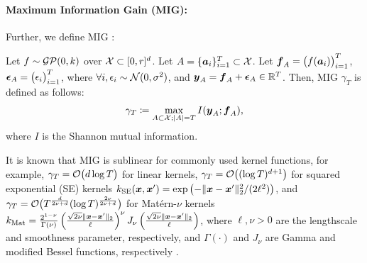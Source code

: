 \paragraph{Maximum Information Gain (MIG):}
%
Further, we define MIG \citep{Srinivas2010-Gaussian,vakili2021-information}:
\begin{definition}
    Let $f \sim {\cal G} {\cal P} (0, k)$ over ${\cal X} \subset [0, r]^d$.
    Let $A = \{ \boldsymbol{a}_i \}_{i=1}^T \subset {\cal X}$.
    Let $\boldsymbol{f}_A = \bigl(f(\boldsymbol{a}_i) \bigr)_{i=1}^T$, $\boldsymbol{\epsilon}_A = \bigl(\epsilon_i \bigr)_{i=1}^T$, where $\forall i, \epsilon_i \sim {\cal N}(0, \sigma^2)$, and $\boldsymbol{y}_A = \boldsymbol{f}_A + \boldsymbol{\epsilon}_A \in \mathbb{R}^T$.
    Then, MIG $\gamma_T$ is defined as follows:
    \begin{align*}
        \gamma_T \coloneqq \max_{A \subset {\cal X}; |A| = T} I(\boldsymbol{y}_A ; \boldsymbol{f}_A),
    \end{align*}
    where $I$ is the Shannon mutual information.
    \label{def:MIG}
\end{definition}
\noindent
%
It is known that MIG is sublinear for commonly used kernel functions, for example, $\gamma_T = {\cal O}\bigl( d \log T \bigr)$ for linear kernels, $\gamma_T = {\cal O}\bigl( (\log T)^{d+1} \bigr)$ for squared exponential (SE) kernels $k_{\rm SE} (\boldsymbol{x}, \boldsymbol{x}^\prime) = \exp\left( - \| \boldsymbol{x} - \boldsymbol{x}^\prime \|_2^2 / (2 \ell^2) \right)$, and $\gamma_T = {\cal O}\bigl( T^{\frac{d}{2\nu + d}} (\log T)^{\frac{2\nu}{2\nu + d}} \bigr)$ for Mat\'{e}rn-$\nu$ kernels $k_{\rm Mat} = \frac{2^{1 - \nu}}{\Gamma(\nu)} \left( \frac{\sqrt{2\nu} \| \boldsymbol{x} - \boldsymbol{x}^\prime \|_2 }{\ell} \right)^{\nu} J_{\nu} \left( \frac{\sqrt{2\nu} \| \boldsymbol{x} - \boldsymbol{x}^\prime \|_2 }{\ell} \right) $, where $\ell, \nu > 0$ are the lengthscale and smoothness parameter, respectively, and $\Gamma(\cdot)$ and $J_{\nu}$ are Gamma and modified Bessel functions, respectively \citep{Srinivas2010-Gaussian,vakili2021-information}.



